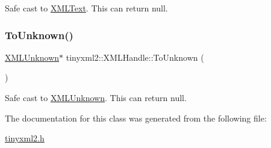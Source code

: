 Safe cast to \mbox{\hyperlink{classtinyxml2_1_1_x_m_l_text}{X\+M\+L\+Text}}. This can return null. 

\mbox{\label{classtinyxml2_1_1_x_m_l_handle_aa387368a1ad8d843a9f12df863d298de}} 
\subsubsection{\texorpdfstring{To\+Unknown()}{ToUnknown()}}
{\footnotesize\ttfamily \mbox{\hyperlink{classtinyxml2_1_1_x_m_l_unknown}{X\+M\+L\+Unknown}}$\ast$ tinyxml2\+::\+X\+M\+L\+Handle\+::\+To\+Unknown (\begin{DoxyParamCaption}{ }\end{DoxyParamCaption})\hspace{0.3cm}{\ttfamily [inline]}}



Safe cast to \mbox{\hyperlink{classtinyxml2_1_1_x_m_l_unknown}{X\+M\+L\+Unknown}}. This can return null. 



The documentation for this class was generated from the following file\+:\begin{DoxyCompactItemize}
\item 
\mbox{\hyperlink{tinyxml2_8h}{tinyxml2.\+h}}\end{DoxyCompactItemize}
